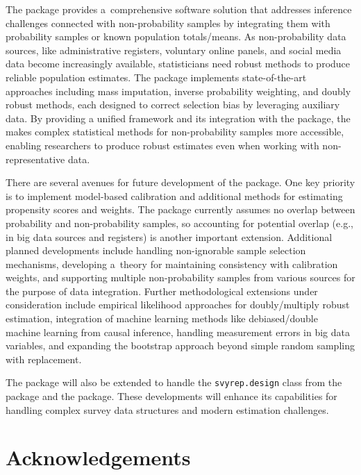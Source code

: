 \documentclass[nojss]{jss}
\begin{document}
The  package provides a~comprehensive 
software solution that addresses inference challenges connected with
non-probability samples by integrating them with probability samples or
known population totals/means. As non-probability data sources, like
administrative registers, voluntary online panels, and social media data
become increasingly available, statisticians need robust methods to
produce reliable population estimates. The package implements
state-of-the-art approaches including mass imputation, inverse
probability weighting, and doubly robust methods, each designed to
correct selection bias by leveraging auxiliary data. By providing a
unified framework and its integration with the  package, the
 makes complex statistical methods for non-probability
samples more accessible, enabling researchers to produce robust
estimates even when working with non-representative data.

There are several avenues for future development of the 
package. One key priority is to implement model-based calibration and
additional methods for estimating propensity scores and weights. The
package currently assumes no overlap between probability and
non-probability samples, so accounting for potential overlap (e.g., in
big data sources and registers) is another important extension.
Additional planned developments include handling non-ignorable sample
selection mechanisms, developing a~theory for maintaining consistency
with calibration weights, and supporting multiple non-probability
samples from various sources for the purpose of data integration.
Further methodological extensions under consideration include empirical
likelihood approaches for doubly/multiply robust estimation, integration
of machine learning methods like debiased/double machine learning from
causal inference, handling measurement errors in big data variables, and
expanding the bootstrap approach beyond simple random sampling with
replacement.

The package will also be extended to handle the \texttt{svyrep.design}
class from the  package and the  package. These
developments will enhance its capabilities for handling complex survey
data structures and modern estimation challenges.

\section{Acknowledgements}\label{sec-acknowledgements}
\end{document}
